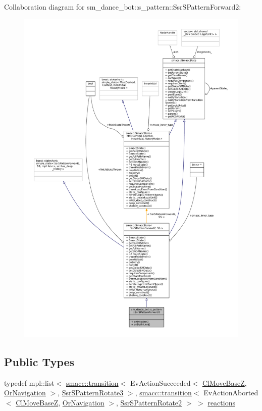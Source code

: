 Collaboration diagram for sm\+\_\+dance\+\_\+bot\+:\+:s\+\_\+pattern\+:\+:Ssr\+S\+Pattern\+Forward2\+:
\nopagebreak
\begin{figure}[H]
\begin{center}
\leavevmode
\includegraphics[width=350pt]{structsm__dance__bot_1_1s__pattern_1_1SsrSPatternForward2__coll__graph}
\end{center}
\end{figure}
\subsection*{Public Types}
\begin{DoxyCompactItemize}
\item 
typedef mpl\+::list$<$ \hyperlink{classsmacc_1_1transition}{smacc\+::transition}$<$ Ev\+Action\+Succeeded$<$ \hyperlink{classmove__base__z__client_1_1ClMoveBaseZ}{Cl\+Move\+BaseZ}, \hyperlink{classsm__dance__bot_1_1OrNavigation}{Or\+Navigation} $>$, \hyperlink{structsm__dance__bot_1_1s__pattern_1_1SsrSPatternRotate3}{Ssr\+S\+Pattern\+Rotate3} $>$, \hyperlink{classsmacc_1_1transition}{smacc\+::transition}$<$ Ev\+Action\+Aborted$<$ \hyperlink{classmove__base__z__client_1_1ClMoveBaseZ}{Cl\+Move\+BaseZ}, \hyperlink{classsm__dance__bot_1_1OrNavigation}{Or\+Navigation} $>$, \hyperlink{structsm__dance__bot_1_1s__pattern_1_1SsrSPatternRotate2}{Ssr\+S\+Pattern\+Rotate2} $>$ $>$ \hyperlink{structsm__dance__bot_1_1s__pattern_1_1SsrSPatternForward2_ad3469b0e397f305306984b8c6e144a3f}{reactions}
\end{DoxyCompactItemize}
